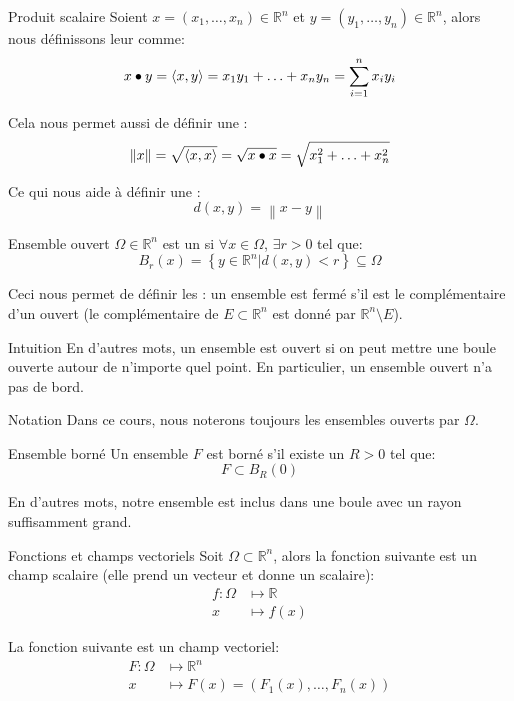 \documentclass[a4paper]{article}
\begin{document}
\begin{parag}{Produit scalaire}
    Soient $x = \left(x_1, \ldots, x_n\right)\in \mathbb{R}^n$ et $y = \left(y_1, \ldots, y_n\right) \in \mathbb{R}^n$, alors nous définissons leur  comme: 
    \[x \dotprod y = \left<x, y\right> = x_1 y_1 + \ldots + x_n y_n = \sum_{i=1}^{n} x_i y_i\]
    
    Cela nous permet aussi de définir une :
    \[\left\|x\right\| = \sqrt{\left<x, x\right>} = \sqrt{x \dotprod x} = \sqrt{x_1^2 + \ldots + x_n^2}\]

    Ce qui nous aide à définir une : 
    \[d\left(x, y\right) = \left\|x - y\right\|\]
\end{parag}

\begin{parag}{Ensemble ouvert}
    $\Omega \in \mathbb{R}^n$ est un  si $\forall x \in \Omega$, $\exists r > 0$ tel que: 
    \[B_{r}\left(x\right) = \left\{y \in \mathbb{R}^n | d\left(x, y\right) < r\right\} \subseteq \Omega\]

    Ceci nous permet de définir les : un ensemble est fermé s'il est le complémentaire d'un ouvert (le complémentaire de $E \subset \mathbb{R}^n$ est donné par $\mathbb{R}^n \setminus E$).

    \begin{subparag}{Intuition}
        En d'autres mots, un ensemble est ouvert si on peut mettre une boule ouverte autour de n'importe quel point. En particulier, un ensemble ouvert n'a pas de bord.
    \end{subparag}

    \begin{subparag}{Notation}
        Dans ce cours, nous noterons toujours les ensembles ouverts par $\Omega$.
    \end{subparag}
\end{parag}

\begin{parag}{Ensemble borné}
    Un ensemble $F$ est borné s'il existe un $R > 0$ tel que: 
    \[F \subset B_R\left(0\right)\]
    
    En d'autres mots, notre ensemble est inclus dans une boule avec un rayon suffisamment grand.
\end{parag}

\begin{parag}{Fonctions et champs vectoriels}
    Soit $\Omega \subset \mathbb{R}^n$, alors la fonction suivante est un champ scalaire (elle prend un vecteur et donne un scalaire): 
    \[\begin{split}
    f: \Omega &\longmapsto \mathbb{R} \\
    x &\longmapsto f\left(x\right)
    \end{split}\]
    
    La fonction suivante est un champ vectoriel: 
    \[\begin{split}
    F: \Omega &\longmapsto \mathbb{R}^n \\
    x &\longmapsto F\left(x\right) = \left(F_1\left(x\right), \ldots, F_n\left(x\right)\right)
    \end{split}\]
\end{parag}
\end{document}
